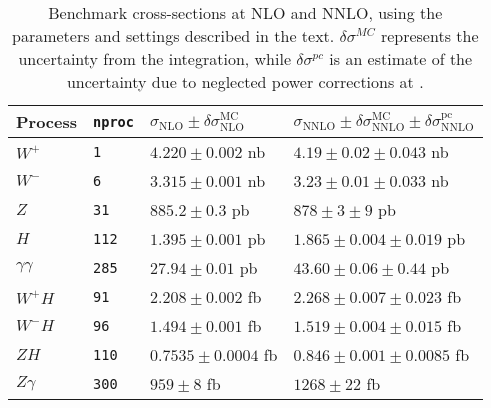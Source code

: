 \begin{table}
\begin{center}
	\caption{Benchmark cross-sections at NLO and NNLO, using the parameters
		and settings described in the text.  $\delta\sigma^{MC}$ represents the uncertainty
		from the integration, while $\delta\sigma^{pc}$ is an estimate of the
		uncertainty due to neglected power corrections at \NNLO{}.}
	\label{NNLObenchmarks} 
	\vspace{0.5em}
\begin{tabular}{|l|l|l|l|} \hline
Process & {\tt nproc} & $\sigma_\mathrm{NLO} \pm \delta\sigma_\mathrm{NLO}^\mathrm{MC} $ & 
$\sigma_\mathrm{NNLO} \pm 
\delta\sigma_\mathrm{NNLO}^\mathrm{MC} \pm \delta\sigma_\mathrm{NNLO}^\mathrm{pc}$ \\ 
\hline
$W^+$ & {\tt 1}    & $4.220 \pm 0.002$ nb & $4.19 \pm 0.02 \pm 0.043$ nb\\
$W^-$ & {\tt 6}    & $3.315 \pm 0.001$ nb & $3.23 \pm 0.01 \pm 0.033$ nb\\
$Z  $ & {\tt 31}   & $885.2 \pm 0.3$ pb & $878 \pm 3 \pm 9$ pb\\
$H  $ & {\tt 112}  & $1.395 \pm 0.001$ pb & $1.865 \pm 0.004 \pm 0.019$ pb\\
$\gamma\gamma  $ & {\tt 285}  & $27.94 \pm 0.01$ pb & $43.60 \pm 0.06 \pm 0.44$ pb\\
$W^+H$ & {\tt 91}    & $2.208 \pm 0.002$ fb & $2.268 \pm 0.007 \pm 0.023$ fb\\
$W^-H$ & {\tt 96}    & $1.494 \pm 0.001$ fb & $1.519 \pm 0.004 \pm 0.015$ fb\\
$ZH$   & {\tt 110}   & $0.7535 \pm 0.0004$ fb & $0.846 \pm 0.001 \pm 0.0085$ fb\\
$Z\gamma$ & {\tt 300} & $959 \pm 8$ fb & $1268 \pm 22 $ fb \\
\hline
\end{tabular}

\end{center}
\end{table}
